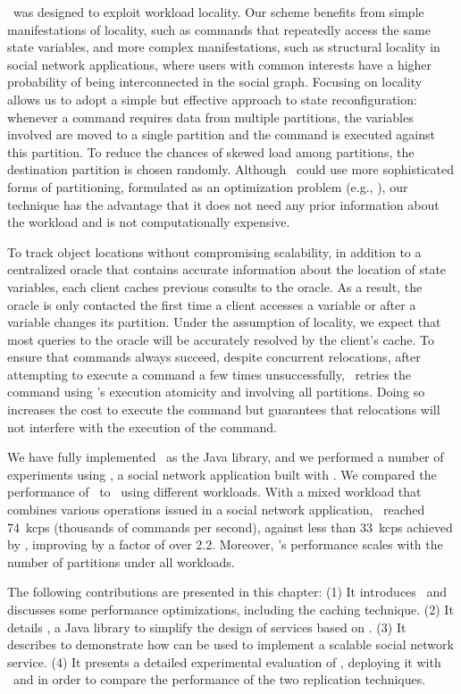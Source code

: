 \dssmr\ was designed to exploit workload locality. Our scheme benefits from
simple manifestations of locality, such as commands that repeatedly access the
same state variables, and more complex manifestations, such as structural
locality in social network applications, where users with common interests have
a higher probability of being interconnected in the social graph. Focusing on
locality allows us to adopt a simple but effective approach to state
reconfiguration: whenever a command requires data from multiple partitions, the
variables involved are moved to a single partition and the command is executed
against this partition. To reduce the chances of skewed load among partitions,
the destination partition is chosen randomly. Although \dssmr\ could use more
sophisticated forms of partitioning, formulated as an optimization problem
(e.g., \cite{curino2010sch,taft2014est}), our technique has the advantage that
it does not need any prior information about the workload and is not
computationally expensive.

To track object locations without compromising scalability, in addition to a
centralized oracle that contains accurate information about the location of
state variables, each client caches previous consults to the oracle. As a
result, the oracle is only contacted the first time a client accesses a variable
or after a variable changes its partition. Under the assumption of locality, we
expect that most queries to the oracle will be accurately resolved by the
client's cache. To ensure that commands always succeed, despite concurrent
relocations, after attempting to execute a command a few times unsuccessfully,
\dssmr\ retries the command using \ssmr{}'s execution atomicity and involving
all partitions. Doing so increases the cost to execute the command but
guarantees that relocations will not interfere with the execution of the
command.

We have fully implemented \dssmr\ as the \dssmrlibname{} Java library, and we
performed a number of experiments using \dssmrappname{}, a social network
application built with \dssmrlibname{}. We compared the performance of \dssmr\
to \ssmr\ using different workloads. With a mixed workload that combines various
operations issued in a social network application, \dssmr\ reached 74~kcps
(thousands of commands per second), against less than 33~kcps achieved by
\ssmr{}, improving by a factor of over 2.2. Moreover, \dssmr's performance
scales with the number of partitions under all workloads.

The following contributions are presented in this chapter:
(1) It introduces \dssmr\ and discusses some performance optimizations, including
the caching technique.
(2) It details \dssmrlibname{}, a Java library to simplify the design of services based
on \dssmr{}.
(3) It describes \dssmrappname{} to demonstrate how \dssmrlibname{} can be used to implement
a scalable social network service.
(4) It presents a detailed experimental evaluation of \dssmrappname{}, deploying it with
\ssmr\ and \dssmr{} in order to compare the performance of the two replication
techniques.

